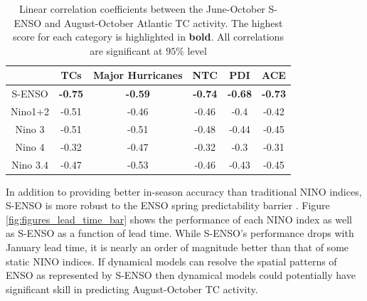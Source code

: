 \begin{table}
\begin{tabular}{cccccc}
\hline
&TCs & Major Hurricanes & NTC & PDI & ACE\\
\hline
S-ENSO & \textbf{-0.75} & \textbf{-0.59} &\textbf{-0.74} & \textbf{-0.68} & \textbf{-0.73}\\
Nino1+2 & -0.51 & -0.46 & -0.46 & -0.4 & -0.42\\
Nino 3 & -0.51 & -0.51 & -0.48 & -0.44 & -0.45\\
Nino 4 & -0.32 & -0.47 & -0.32 & -0.3 & -0.31\\
Nino 3.4 & -0.47 & -0.53 & -0.46 & -0.43 & -0.45\\
\hline
\end{tabular}
\caption{Linear correlation coefficients between the June-October S-ENSO and August-October Atlantic TC activity. The highest score for each category is highlighted in \textbf{bold}. All correlations are significant at $95\%$ level}
\label{ref:lin_corr}
\end{table}

In addition to providing better in-season accuracy than traditional NINO indices, S-ENSO is more robust to the ENSO spring predictability barrier \cite{webster1992}. Figure \ref{fig:figures_lead_time_bar} shows the performance of each NINO index as well as S-ENSO as a function of lead time. While S-ENSO's performance drops with January lead time, it is nearly an order of magnitude better than that of some static NINO indices. If dynamical models can resolve the spatial patterns of ENSO as represented by S-ENSO then dynamical models could potentially have significant skill in predicting August-October TC activity.

